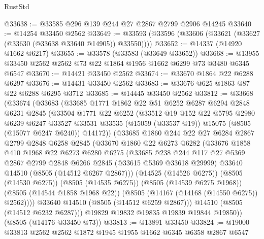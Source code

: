 \begin{lexlean}{RustStd}
\begin{coremodule}
@33638 := @33585 @296 @139 @244 @27 @2867 @2799 @2906 @14245
@33640 := @14254 @33450 @2562
@33649 := @33593 (@33596 (@33606 (@33621 (@33627 (@33630 (@33638 @33640 @14905)) @33550))))
@33652 := @14337 (@14920 @1662 @6217)
@33655 := @33578 (@33583 (@33649 @33652))
@33668 := @13955 @33450 @2562 @2562 @73 @22 @1864 @1956 @1662 @6299 @73 @3480 @6345 @6547
@33670 := @14421 @33450 @2562
@33674 := @33670 @1864 @22 @6288 @6297
@33676 := @14431 @33450 @2562
@33683 := @33676 @625 @1863 @87 @22 @6288 @6295 @3712
@33685 := @14445 @33450 @2562
@33812 := @33668
    (@33674
      (@33683
        (@33685
          @1771
          @1862
          @22
          @51
          @6252
          @6287
          @6294
          @2848
          @6231
          @2845
          (@33504
            @1771
            @22
            @6252
            (@33512
              @19
              @152
              @22
              @5795
              @2980
              @6239
              @6247
              @33527
              @33531
              @33535
              (@15059 (@33537 @19))
              @15075
              (@8505 (@15077 @6247 @6240))
              @14172))
          (@33685
            @1860
            @244
            @22
            @27
            @6284
            @2867
            @2799
            @2848
            @6258
            @2845
            (@33670
              @1860
              @22
              @6273
              @6282
              (@33676
                @1858
                @410
                @1968
                @22
                @6273
                @6280
                @6275
                (@33685
                  @238
                  @244
                  @117
                  @27
                  @5369
                  @2867
                  @2799
                  @2848
                  @6266
                  @2845
                  (@33615 @5369 @33618 @29999)
                  @33640
                  @14510
                  (@8505 (@14512 @6267 @2867)))
                (@14525 (@14526 @6275))
                (@8505 (@14530 @6275))
                (@8505 (@14535 @6275))
                (@8505 (@14539 @6275 @1968))
                (@8505 (@14544 @1858 @1968 @22))
                (@8505 (@14167 (@14168 (@14550 @6275)) @2562))))
            @33640
            @14510
            (@8505 (@14512 @6259 @2867)))
          @14510
          (@8505 (@14512 @6232 @6287)))
        @19829
        @19832
        @19835
        @19839
        @19844
        @19850))
    (@8505 (@14176 @33450 @73))
@33813 := @13891 @33450
@33824 := @19000 @33813 @2562 @2562 @1872 @1945 @1955 @1662 @6345 @6358 @2867 @6547

\end{coremodule}
\end{lexlean}
